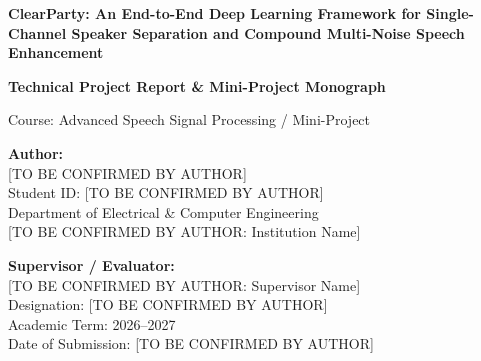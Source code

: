 \documentclass[11pt,a4paper]{report}
\begin{document}
\begin{titlepage}
    \centering
    \vspace*{1.0cm}
    
    {\Huge \bfseries ClearParty: An End-to-End Deep Learning Framework for Single-Channel Speaker Separation and Compound Multi-Noise Speech Enhancement \par}
    
    \vspace{1.2cm}
    {\Large \bfseries Technical Project Report \& Mini-Project Monograph \par}
    \vspace{0.4cm}
    {\large Course: Advanced Speech Signal Processing / Mini-Project \par}
    
    \vspace{2.0cm}
    
    \begin{minipage}{0.48\textwidth}
        \begin{flushleft} \large
            \textbf{Author:} \\
            {[TO BE CONFIRMED BY AUTHOR]} \\
            Student ID: [TO BE CONFIRMED BY AUTHOR] \\
            Department of Electrical \& Computer Engineering \\
            {[TO BE CONFIRMED BY AUTHOR: Institution Name]}
        \end{flushleft}
    \end{minipage}
    \hfill
    \begin{minipage}{0.48\textwidth}
        \begin{flushright} \large
            \textbf{Supervisor / Evaluator:} \\
            {[TO BE CONFIRMED BY AUTHOR: Supervisor Name]} \\
            Designation: [TO BE CONFIRMED BY AUTHOR] \\
            Academic Term: 2026--2027 \\
            Date of Submission: [TO BE CONFIRMED BY AUTHOR]
        \end{flushright}
    \end{minipage}

    \vfill
    

\end{titlepage}
\end{document}

